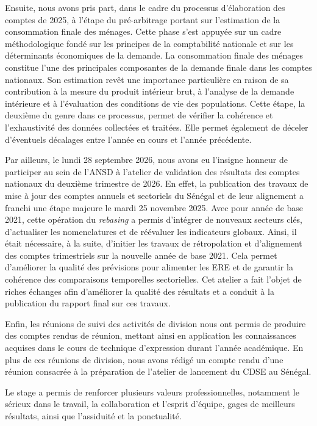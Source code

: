 \documentclass[12pt,a4paper]{report}
\begin{document}
Ensuite, nous avons pris part, dans le cadre du processus d’élaboration des comptes de 2025, à l’étape du pré-arbitrage portant sur l’estimation de la consommation finale des ménages. Cette phase s’est appuyée sur un cadre méthodologique fondé sur les principes de la comptabilité nationale et sur les déterminants économiques de la demande. La consommation finale des ménages constitue l’une des principales composantes de la demande finale dans les comptes nationaux. Son estimation revêt une importance particulière en raison de sa contribution à la mesure du produit intérieur brut, à l’analyse de la demande intérieure et à l’évaluation des conditions de vie des populations. Cette étape, la deuxième du genre dans ce processus, permet de vérifier la cohérence et l’exhaustivité des données collectées et traitées. Elle permet également de déceler d’éventuels décalages entre l’année en cours et l’année précédente.

Par ailleurs, le lundi 28 septembre 2026, nous avons eu l'insigne honneur de participer au sein de l'ANSD à l'atelier de validation des résultats des comptes nationaux du deuxième trimestre de 2026. En effet, la publication des travaux de mise à jour des comptes annuels et sectoriels du Sénégal et de leur alignement a franchi une étape majeure le mardi 25 novembre 2025. Avec pour année de base 2021, cette opération du \textit{rebasing} a permis d'intégrer de nouveaux secteurs clés, d'actualiser les nomenclatures et de réévaluer les indicateurs globaux. Ainsi, il était nécessaire, à la suite, d'initier les travaux de rétropolation et d'alignement des comptes trimestriels sur la nouvelle année de base 2021. Cela permet d'améliorer la qualité des prévisions pour alimenter les ERE et de garantir la cohérence des comparaisons temporelles sectorielles. Cet atelier a fait l'objet de riches échanges afin d'améliorer la qualité des résultats et a conduit à la publication du rapport final sur ces travaux.

Enfin, les réunions de suivi des activités de division nous ont permis de produire des comptes rendus de réunion, mettant ainsi en application les connaissances acquises dans le cours de technique d'expression durant l'année académique. En plus de ces réunions de division, nous avons rédigé un compte rendu d'une réunion consacrée à la préparation de l'atelier de lancement du CDSE au Sénégal.

Le stage a permis de renforcer plusieurs valeurs professionnelles, notamment le sérieux dans le travail, la collaboration et l'esprit d'équipe, gages de meilleurs résultats, ainsi que l'assiduité et la ponctualité.
\end{document}
